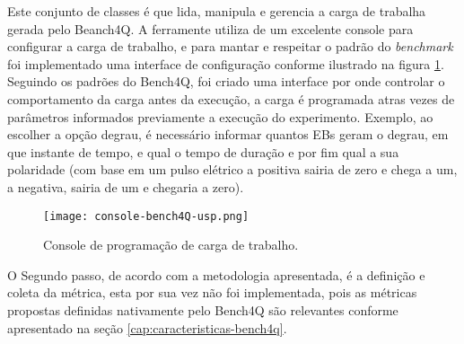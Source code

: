 	
Este conjunto de classes é que lida, manipula e gerencia a carga de trabalha gerada pelo Beanch4Q. A ferramente utiliza de um excelente console para configurar a carga de trabalho, e para mantar e respeitar o padrão do \textit{benchmark} foi implementado uma interface de configuração conforme ilustrado na figura \ref{fig:interface-criada-beanch4q}. Seguindo os padrões do Bench4Q, foi criado uma interface por onde controlar o comportamento da carga antes da execução, a carga é programada atras vezes de parâmetros informados previamente a execução do experimento. Exemplo, ao escolher a opção degrau, é necessário informar quantos EBs geram o degrau, em que instante de tempo, e qual o tempo de duração e por fim qual a sua polaridade (com base em um pulso elétrico a positiva sairia de zero e chega a um, a negativa, sairia de um e chegaria a zero).

\begin{figure}[htb]
	\caption{Console de programação de carga de trabalho.}
	\label{fig:interface-criada-beanch4q}
	\centering
	\texttt{[image: console-bench4Q-usp.png]}
\end{figure}
	
	


O Segundo passo, de acordo com a metodologia apresentada, é a definição e coleta da métrica, esta por sua vez não foi implementada, pois as métricas propostas definidas nativamente pelo Bench4Q são relevantes conforme apresentado na seção \ref{cap:caracteristicas-bench4q}.

